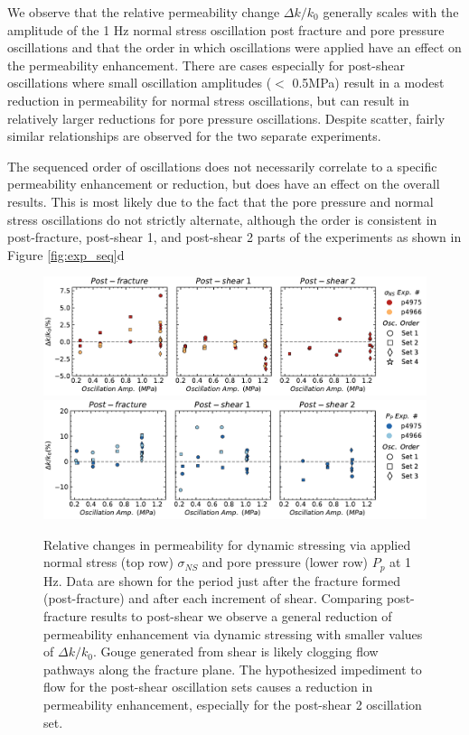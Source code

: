 \documentclass[letterpaper,10pt]{article}
\begin{document}
	We observe that the relative permeability change $ \Delta k/k_0 $ generally scales with the amplitude of the 1 Hz normal stress oscillation post fracture and pore pressure oscillations and that the order in which oscillations were applied have an effect on the permeability enhancement. There are cases especially for post-shear oscillations where small oscillation amplitudes ($< $ 0.5MPa) result in a modest reduction in permeability for normal stress oscillations, but can result in relatively larger reductions for pore pressure oscillations. Despite scatter, fairly similar relationships are observed for the two separate experiments.
	
	The sequenced order of oscillations does not necessarily correlate to a specific permeability enhancement or reduction, but does have an effect on the overall results. This is most likely due to the fact that the pore pressure and normal stress oscillations do not strictly alternate, although the order is consistent in post-fracture, post-shear 1, and post-shear 2 parts of the experiments as shown in Figure \ref{fig:exp_seq}d 
	
	
	
	\clearpage
	
	\begin{figure}[ht]
		\centering
		\includegraphics[width=1\columnwidth]{delk_amp_NS}
		\includegraphics[width=1\columnwidth]{delk_amp_PP}
		\caption{Relative changes in permeability for dynamic stressing via applied normal stress (top row)  $ \sigma_{NS} $ and pore pressure (lower row) $ P_p $ at 1 Hz. Data are shown for the period just after the fracture formed (post-fracture) and after each increment of shear. Comparing post-fracture results to post-shear we observe a general reduction of permeability enhancement via dynamic stressing with smaller values of $ \Delta k/k_0 $. Gouge generated from shear is likely clogging flow pathways along the fracture plane. The hypothesized impediment to flow for the post-shear oscillation sets causes a reduction in permeability enhancement, especially for the post-shear 2 oscillation set.}
		\label{fig:perm_ns_amp}
	\end{figure}
	
\end{document}
